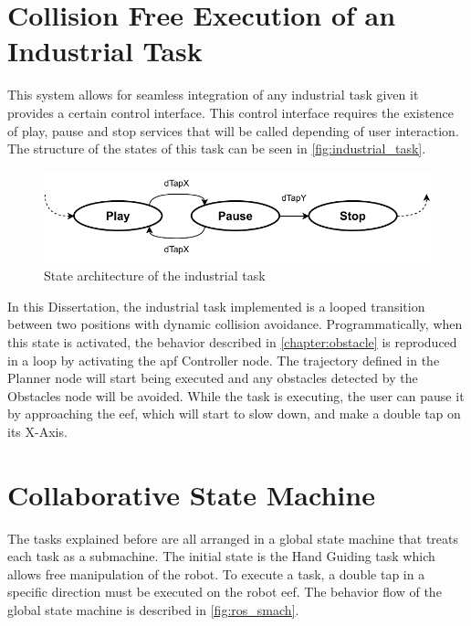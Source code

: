 





\section{Collision Free Execution of an Industrial Task}

\par This system allows for seamless integration of any industrial task given it provides a certain control interface. This control interface requires the existence of play, pause and stop services that will be called depending of user interaction. The structure of the states of this task can be seen in \autoref{fig:industrial_task}.

\begin{figure}[h]
    \centering
    \includegraphics[width=0.7\linewidth]{figs/chp5/industrial_task.pdf}
    \caption{State architecture of the industrial task}
    \label{fig:industrial_task}
\end{figure}

\par In this Dissertation, the industrial task implemented is a looped transition between two positions with dynamic collision avoidance. Programmatically, when this state is activated, the behavior described in \autoref{chapter:obstacle} is reproduced in a loop by activating the \ac{apf} Controller node. The trajectory defined in the Planner node will start being executed and any obstacles detected by the Obstacles node will be avoided. While the task is executing, the user can pause it by approaching the \ac{eef}, which will start to slow down, and make a double tap on its X-Axis.





\section{Collaborative State Machine}

\par The tasks explained before are all arranged in a global state machine that treats each task as a submachine. The initial state is the Hand Guiding task which allows free manipulation of the robot. To execute a task, a double tap in a specific direction must be executed on the robot \ac{eef}. The behavior flow of the global state machine is described in \autoref{fig:ros_smach}.

